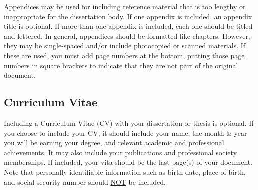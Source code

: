 Appendices may be used for including reference material that is too lengthy or inappropriate for the dissertation body.
If one appendix is included, an appendix title is optional.
If more than one appendix is included, each one should be titled and lettered.
In general, appendices should be formatted like chapters.
However, they may be single-spaced and/or include photocopied or scanned materials.
If these are used, you must add page numbers at the bottom, putting those page numbers in square brackets to indicate that they are not part of the original document.

\subsection{Curriculum Vitae}

Including a Curriculum Vitae (CV) with your dissertation or thesis is optional.
If you choose to include your CV, it should include your name, the month \& year you will be earning your degree, and relevant academic and professional achievements.
It may also include your publications and professional society memberships.
If included, your vita should be the last page(s) of your document.
Note that personally identifiable information such as birth date, place of birth, and social security number should \underline{NOT} be included.
